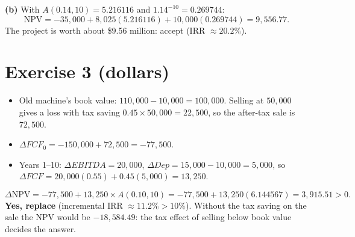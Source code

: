 \documentclass[11pt,a4paper]{article}
\begin{document}
\textbf{(b)} With $A(0.14,10)=5.216116$ and $1.14^{-10}=0.269744$:
$$\mathrm{NPV} = -35{,}000 + 8{,}025(5.216116) + 10{,}000(0.269744) = 9{,}556.77 .$$
The project is worth about \$9.56 million: accept (IRR $\approx 20.2\%$).

\section*{Exercise 3 \normalsize(dollars)}

\begin{itemize}[leftmargin=1.4em]
  \item Old machine's book value: $110{,}000-10{,}000 = 100{,}000$. Selling at $50{,}000$ gives a loss
        with tax saving $0.45\times50{,}000 = 22{,}500$, so the after-tax sale is $72{,}500$.
  \item $\Delta FCF_0 = -150{,}000 + 72{,}500 = -77{,}500$.
  \item Years 1--10: $\Delta EBITDA = 20{,}000$, $\Delta Dep = 15{,}000-10{,}000 = 5{,}000$, so
        $\Delta FCF = 20{,}000(0.55) + 0.45(5{,}000) = 13{,}250$.
\end{itemize}
$$\Delta\mathrm{NPV} = -77{,}500 + 13{,}250\times A(0.10,10) = -77{,}500 + 13{,}250(6.144567) = 3{,}915.51 > 0 .$$
\textbf{Yes, replace} (incremental IRR $\approx 11.2\% > 10\%$). Without the tax saving on the sale
the NPV would be $-18{,}584.49$: the tax effect of selling below book value decides the answer.
\end{document}
